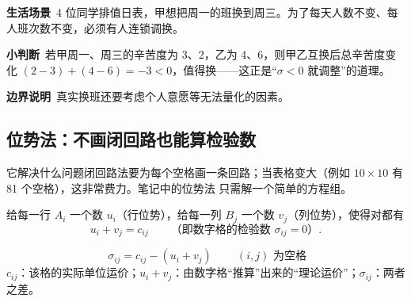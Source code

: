 \begin{lifebox}[同学互换值日]
\textbf{生活场景}\ 4 位同学排值日表，甲想把周一的班换到周三。为了每天人数不变、每人班次数不变，必须有人连锁调换。\par
{}
\textbf{小判断}\ 若甲周一、周三的辛苦度为 3、2，乙为 4、6，则甲乙互换后总辛苦度变化 $(2-3)+(4-6)=-3<0$，值得换——这正是“$\sigma<0$ 就调整”的道理。\par
\textbf{边界说明}\ 真实换班还要考虑个人意愿等无法量化的因素。
\end{lifebox}

\subsection{位势法：不画闭回路也能算检验数}
\noindent\textsf{\color{blue2}它解决什么问题}\quad 闭回路法要为每个空格画一条回路；当表格变大（例如 $10\times10$ 有 81 个空格），这非常费力。笔记中的位势法 \orig 只需解一个简单的方程组。

\begin{definitionbox}[位势]
给每一行 $A_i$ 一个数 $u_i$（行位势），给每一列 $B_j$ 一个数 $v_j$（列位势），使得对都有
\[
u_i+v_j=c_{ij}\qquad\text{（即数字格的检验数 }\sigma_{ij}=0\text{）}.
\]
\end{definitionbox}
\begin{formulabox}[空格检验数]
\[
\boxed{\ \sigma_{ij}=c_{ij}-(u_i+v_j)\ }\qquad(i,j)\text{ 为空格}
\]
$c_{ij}$：该格的实际单位运价；$u_i+v_j$：由数字格“推算”出来的“理论运价”；$\sigma_{ij}$：两者之差。
\end{formulabox}

